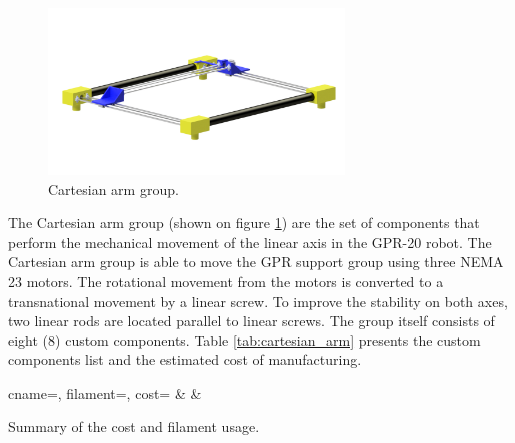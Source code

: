 \documentclass{article}
\begin{document}
\begin{figure}[h]
    \centering
    \includegraphics[width=0.7\textwidth]{images/groups/cartesian_arm.png}
    \caption{Cartesian arm group.}
    \label{fig:cartesian_arm_group}
\end{figure}

The Cartesian arm group (shown on figure \ref{fig:cartesian_arm_group}) are the set of components that perform the mechanical movement of the linear axis in the GPR-20 robot. The Cartesian arm group is able to move the GPR support group using three NEMA 23 motors. The rotational movement from the motors is converted to a transnational movement by a linear screw. To improve the stability on both axes, two linear rods are located parallel to linear screws. The group itself consists of eight (8) custom components. Table \ref{tab:cartesian_arm} presents the custom components list and the estimated cost of manufacturing.

\begin{table}[h]
    \centering
    {cname=\cname, filament=\filament, cost=\cost}%
    {\cname & \filament & \cost}%
    \caption{Summary of the cost and filament usage.}
    \label{tab:cartesian_arm}
\end{table}

\clearpage

\end{document}
